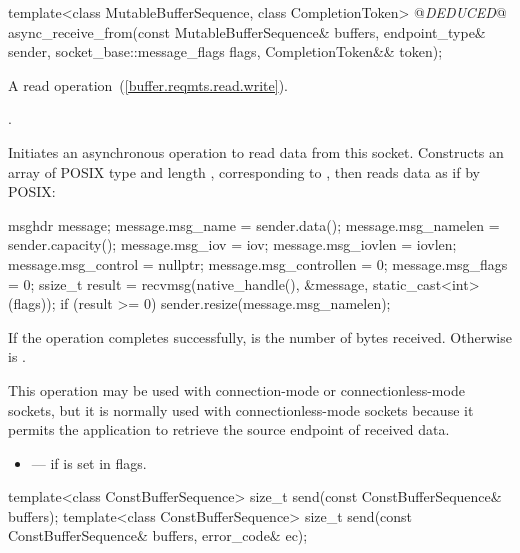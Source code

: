 \begin{itemdecl}
template<class MutableBufferSequence, class CompletionToken>
  @\textit{DEDUCED}@ async_receive_from(const MutableBufferSequence& buffers,
                             endpoint_type& sender,
                             socket_base::message_flags flags,
                             CompletionToken&& token);
\end{itemdecl}

\begin{itemdescr}
\pnum
A read operation~(\ref{buffer.reqmts.read.write}).

\pnum
\completionsig {}.

\pnum
\effects Initiates an asynchronous operation to read data from this socket. Constructs an array  of POSIX type  and length , corresponding to , then reads data as if by POSIX: 
\begin{codeblock}
msghdr message;
message.msg_name = sender.data();
message.msg_namelen = sender.capacity();
message.msg_iov = iov;
message.msg_iovlen = iovlen;
message.msg_control = nullptr;
message.msg_controllen = 0;
message.msg_flags = 0;
ssize_t result = recvmsg(native_handle(), &message, static_cast<int>(flags));
if (result >= 0)
  sender.resize(message.msg_namelen);
\end{codeblock}


\pnum
If the operation completes successfully,  is the number of bytes received. Otherwise  is .

\pnum
 \enternote This operation may be used with connection-mode or connectionless-mode sockets, but it is normally used with connectionless-mode sockets because it permits the application to retrieve the source endpoint of received data. \exitnote

\pnum
\errors
\begin{itemize}
\item
{} --- if  is set in flags.
\end{itemize}
\end{itemdescr}

\begin{itemdecl}
template<class ConstBufferSequence>
  size_t send(const ConstBufferSequence& buffers);
template<class ConstBufferSequence>
  size_t send(const ConstBufferSequence& buffers, error_code& ec);
\end{itemdecl}

